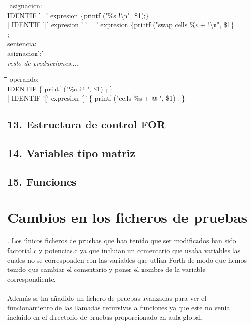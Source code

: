 \documentclass[11pt,spanish]{article}
\begin{document}
		\begin{tabbing}
            \hspace*{1cm}\=\hspace*{1cm}\= \hspace*{8cm}\=\kill
			asignacion:\\
				\>IDENTIF '=' expresion\> \>											\{printf ("\%s !\textbackslash n", \$1);\}\\
				\>| IDENTIF '[' expresion ']' '=' expresion\> \>						\{printf ("swap cells \%s + !\textbackslash n", \$1\}\\
	
			;\\
			sentencia:\\
				\>asignacion';'\\
				\>\textit{resto de producciones....}\\
			
		\end{tabbing}
		\begin{tabbing}
            \hspace*{1cm}\=\hspace*{1cm}\= \hspace*{4cm}\=\kill
		operando:\\      
				\>IDENTIF\> \>      		\{ printf ("\%s @ ", \$1) ; \}\\
				\>| IDENTIF '[' expresion ']'\> \> \{ printf ("cells \%s + @ ", \$1) ; \}
			
		\end{tabbing}
		\subsection*{13. Estructura de control FOR }
		\subsection*{14. Variables tipo matriz }
		\subsection*{15. Funciones }
		
	\section{Cambios en los ficheros de pruebas}.
	Los únicos ficheros de pruebas que han tenido que ser modificados han sido factorial.c y potencias.c ya que incluian un comentario que usaba variables las cuales no se corresponden con las variables que utliza Forth de modo que hemos tenido que cambiar el comentario y poner el nombre de la variable correspondiente.\\ \\
	Además se ha añadido un fichero de pruebas avanzadas para ver el funcionamiento de las llamadas recursivas a funciones ya que este no venía incluido en el directorio de pruebas proporcionado en aula global.
\end{document}

